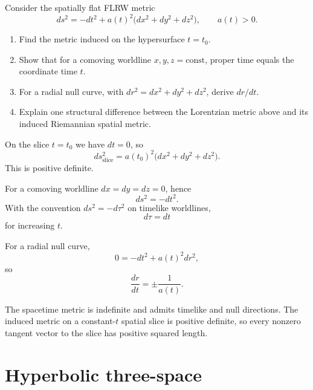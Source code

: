 \begin{problem}
\label{prob:vii-gap-30}
Consider the spatially flat FLRW metric
\[
ds^2=-dt^2+a(t)^2\bigl(dx^2+dy^2+dz^2\bigr),
\qquad a(t)>0.
\]

\begin{enumerate}
\item Find the metric induced on the hypersurface \(t=t_0\).
\item Show that for a comoving worldline \(x,y,z=\mathrm{const}\), proper
      time equals the coordinate time \(t\).
\item For a radial null curve, with
      \(dr^2=dx^2+dy^2+dz^2\), derive \(dr/dt\).
\item Explain one structural difference between the Lorentzian metric
      above and its induced Riemannian spatial metric.
\end{enumerate}
\end{problem}

\begin{solution}
On the slice \(t=t_0\) we have \(dt=0\), so
\[
ds_{\mathrm{slice}}^2
=
a(t_0)^2\bigl(dx^2+dy^2+dz^2\bigr).
\]
This is positive definite.

For a comoving worldline \(dx=dy=dz=0\), hence
\[
ds^2=-dt^2.
\]
With the convention \(ds^2=-d\tau^2\) on timelike worldlines,
\[
d\tau=dt
\]
for increasing \(t\).

For a radial null curve,
\[
0=-dt^2+a(t)^2dr^2,
\]
so
\[
\boxed{\frac{dr}{dt}=\pm\frac1{a(t)}}.
\]

The spacetime metric is indefinite and admits timelike and null
directions.  The induced metric on a constant-\(t\) spatial slice is
positive definite, so every nonzero tangent vector to the slice has
positive squared length.
\end{solution}


\section{Hyperbolic three-space}

